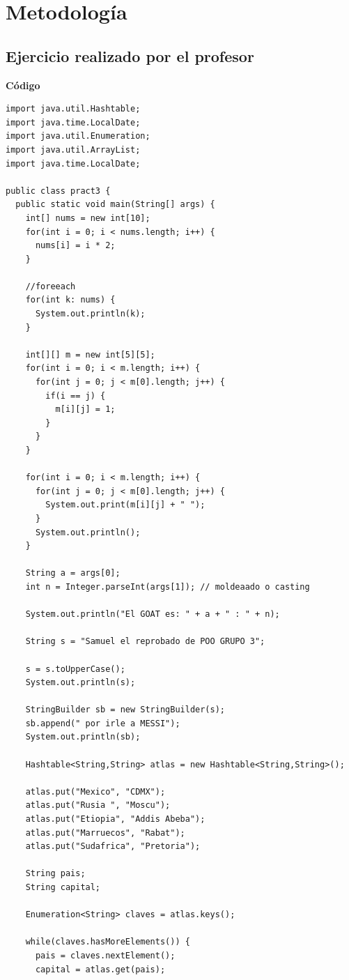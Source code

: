 \documentclass[11pt, twocolumn]{article}
\begin{document}
  \section*{Metodología} 
  \subsection*{Ejercicio realizado por el profesor}
  
  \textbf{Código}
  \begin{lstlisting}
import java.util.Hashtable;
import java.time.LocalDate;
import java.util.Enumeration;
import java.util.ArrayList;
import java.time.LocalDate;

public class pract3 {
  public static void main(String[] args) {
    int[] nums = new int[10];
    for(int i = 0; i < nums.length; i++) {
      nums[i] = i * 2;
    }

    //foreeach
    for(int k: nums) {
      System.out.println(k);
    }

    int[][] m = new int[5][5];
    for(int i = 0; i < m.length; i++) {
      for(int j = 0; j < m[0].length; j++) {
        if(i == j) {
          m[i][j] = 1;
        }
      }
    }

    for(int i = 0; i < m.length; i++) {
      for(int j = 0; j < m[0].length; j++) {
        System.out.print(m[i][j] + " ");
      }
      System.out.println();
    }

    String a = args[0];
    int n = Integer.parseInt(args[1]); // moldeaado o casting

    System.out.println("El GOAT es: " + a + " : " + n);

    String s = "Samuel el reprobado de POO GRUPO 3";

    s = s.toUpperCase();
    System.out.println(s);

    StringBuilder sb = new StringBuilder(s);
    sb.append(" por irle a MESSI");
    System.out.println(sb);

    Hashtable<String,String> atlas = new Hashtable<String,String>();

    atlas.put("Mexico", "CDMX");
    atlas.put("Rusia ", "Moscu");
    atlas.put("Etiopia", "Addis Abeba");
    atlas.put("Marruecos", "Rabat");
    atlas.put("Sudafrica", "Pretoria");

    String pais;
    String capital;

    Enumeration<String> claves = atlas.keys();

    while(claves.hasMoreElements()) {
      pais = claves.nextElement();
      capital = atlas.get(pais);


\end{lstlisting}
\end{document}
